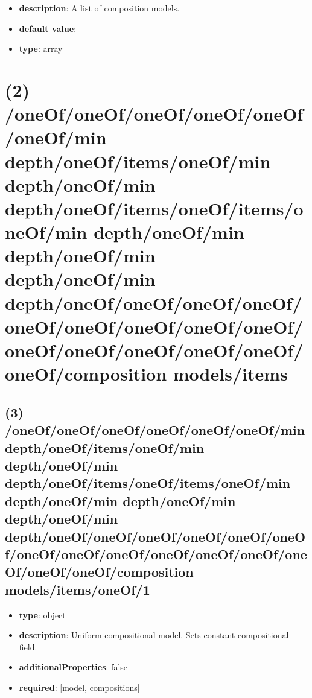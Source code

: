 \begin{itemize}[leftmargin=1em]\item {\bf description}: A list of composition models.
\item {\bf default value}: 
\item {\bf type}: array
\end{itemize}\section{(2) /oneOf/oneOf/oneOf/oneOf/oneOf/oneOf/min depth/oneOf/items/oneOf/min depth/oneOf/min depth/oneOf/items/oneOf/items/oneOf/min depth/oneOf/min depth/oneOf/min depth/oneOf/min depth/oneOf/oneOf/oneOf/oneOf/oneOf/oneOf/oneOf/oneOf/oneOf/oneOf/oneOf/oneOf/oneOf/oneOf/oneOf/composition models/items}

\subsection{(3) /oneOf/oneOf/oneOf/oneOf/oneOf/oneOf/min depth/oneOf/items/oneOf/min depth/oneOf/min depth/oneOf/items/oneOf/items/oneOf/min depth/oneOf/min depth/oneOf/min depth/oneOf/min depth/oneOf/oneOf/oneOf/oneOf/oneOf/oneOf/oneOf/oneOf/oneOf/oneOf/oneOf/oneOf/oneOf/oneOf/oneOf/composition models/items/oneOf/1}
\begin{itemize}[leftmargin=3em]\item {\bf type}: object
\item {\bf description}: Uniform compositional model. Sets constant compositional field.
\item {\bf additionalProperties}: false
\item {\bf required}: [model, compositions]\end{itemize}
